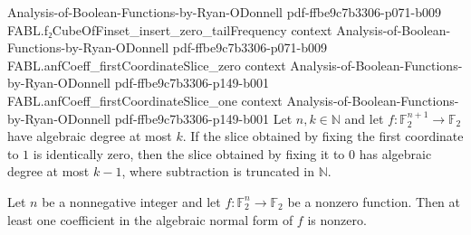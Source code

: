 \begin{theorem}
  {Analysis-of-Boolean-Functions-by-Ryan-ODonnell}
  {pdf-ffbe9c7b3306-p071-b009}
\proofstep
  {FABL.f₂CubeOfFinset_insert_zero_tailFrequency}
  {context}
  {Analysis-of-Boolean-Functions-by-Ryan-ODonnell}
  {pdf-ffbe9c7b3306-p071-b009}
\proofstep
  {FABL.anfCoeff_firstCoordinateSlice_zero}
  {context}
  {Analysis-of-Boolean-Functions-by-Ryan-ODonnell}
  {pdf-ffbe9c7b3306-p149-b001}
\proofstep
  {FABL.anfCoeff_firstCoordinateSlice_one}
  {context}
  {Analysis-of-Boolean-Functions-by-Ryan-ODonnell}
  {pdf-ffbe9c7b3306-p149-b001}
Let $n,k\in\mathbb{N}$ and let $f:\mathbb{F}_2^{n+1}\to\mathbb{F}_2$ have algebraic
degree at most $k$. If the slice obtained by fixing the first coordinate to $1$ is
identically zero, then the slice obtained by fixing it to $0$ has algebraic degree at
most $k-1$, where subtraction is truncated in $\mathbb{N}$.
\end{theorem}

\begin{theorem}
\label{FABL.exists_anfCoeff_ne_zero_of_ne_zero}
\leanok
{}
Let $n$ be a nonnegative integer and let $f:\mathbb F_2^n\to\mathbb F_2$ be a nonzero
function. Then at least one coefficient in the algebraic normal form of $f$ is nonzero.
\end{theorem}

